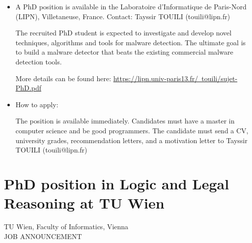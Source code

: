 \documentclass[prodmode,acmtecs]{acmsmall} %
\begin{document}
\begin{itemize}\item  A PhD  position is available in  the  Laboratoire d’Informatique de Paris-Nord (LIPN), Villetaneuse, France. Contact: Tayssir TOUILI  (touili@lipn.fr) 
 
  The  recruited  PhD student  is expected to investigate and develop novel techniques, algorithms and tools for malware detection. The ultimate goal is to build a malware detector that beats the existing commercial malware detection tools. 
 
  More details can be found here: \href{https://lipn.univ-paris13.fr/~touili/sujet-PhD.pdf}{https://lipn.univ-paris13.fr/~touili/sujet-PhD.pdf} 
 
\item  How to apply: 
 
  The position is available immediately. Candidates must have a master in computer science and be  good programmers. The candidate must send a CV, university grades,  recommendation letters, and a motivation letter to Tayssir TOUILI (touili@lipn.fr)  
 
\end{itemize}\section{PhD position in Logic and Legal Reasoning at TU Wien}\label{PhDpositioninLogicandLegalReasoningatTUWien}  TU Wien, Faculty of Informatics, Vienna\\ 
JOB ANNOUNCEMENT 
\end{document}

